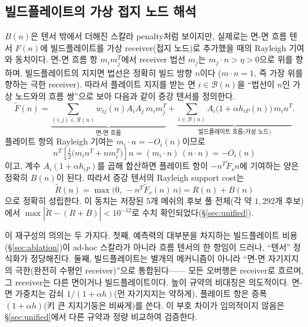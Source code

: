 \documentclass[11pt,a4paper]{article}
\begin{document}
\subsection{빌드플레이트의 가상 접지 노드 해석}
\label{sec:groundnode}

$B(n)$은 텐서 밖에서 더해진 스칼라 penalty처럼 보이지만,
실제로는 면-면 흐름 텐서 $F(n)$에 빌드플레이트를 가상 receiver(접지 노드)로 추가했을 때의
Rayleigh 기여와 동치이다.
면-면 흐름 항 $m_im_j^T$에서 receiver 법선 $m_j$는 $m_j\cdot n>\eta>0$으로 위를 향하며,
빌드플레이트의 지지면 법선은 정확히 빌드 방향 $n$이다
($m\cdot n=1$, 즉 가장 위를 향하는 극한 receiver).
따라서 플레이트 지지를 받는 면 $i\in\mathcal{B}(n)$을 ``법선이 $n$인 가상 노드와의 흐름 쌍''으로 보아
다음과 같이 증강 텐서를 정의한다.
\begin{equation}
\tilde F(n)
=
\underbrace{\sum_{(i,j)\in\mathcal{R}(n)} w_{ij}(n)A_iA_j\,m_im_j^T}_{\text{면-면 흐름}}
+
\underbrace{\sum_{i\in\mathcal{B}(n)} A_i\big(1+\alpha h_{iP}(n)\big)\,m_in^T}_{\text{빌드플레이트 흐름(가상 노드)}}.
\end{equation}
플레이트 항의 Rayleigh 기여는 $m_i\cdot n=-O_i(n)$이므로
\begin{equation}
n^T\!\left[\tfrac{1}{2}\big(m_in^T+nm_i^T\big)\right]\!n
= (m_i\cdot n)\,(n\cdot n) = -O_i(n)
\end{equation}
이고, 계수 $A_i(1+\alpha h_{iP})$를 곱해 합산하면
플레이트 항이 $-n^T\tilde F_s n$에 기여하는 양은 정확히 $B(n)$이 된다.
따라서 증강 텐서의 Rayleigh support cost는
\begin{equation}
\tilde R(n)
=
\max\!\big(0,\,-n^T\tilde F_s(n)\,n\big)
=
R(n)+B(n)
\label{eq:Rtilde}
\end{equation}
으로 정확히 성립한다.
이 동치는 저장된 5개 메쉬의 후보 풀 전체(각 약 $1{,}292$개 후보)에서
$\max|\tilde R-(R+B)|<10^{-12}$로 수치 확인되었다(\S\ref{sec:unified}).

이 재구성의 의의는 두 가지다.
첫째, 예측력의 대부분을 차지하는 빌드플레이트 비용(\S\ref{sec:ablation})이
ad-hoc 스칼라가 아니라 흐름 텐서의 한 항임이 드러나, ``텐서'' 정식화가 정당해진다.
둘째, 빌드플레이트는 별개의 메커니즘이 아니라
``면-면 자기지지의 극한(완전히 수평인 receiver)''으로 통합된다——
모든 오버행은 receiver로 흐르며, 그 receiver는 다른 면이거나 빌드플레이트이다.
높이 규약의 비대칭은 의도적이다.
면-면 가중치는 감쇠 $1/(1+\alpha h)$(먼 자기지지는 약하게),
플레이트 항은 증폭 $(1+\alpha h)$(키 큰 지지기둥은 비싸게)를 쓴다.
이 부호 차이가 임의적이지 않음은 \S\ref{sec:unified}에서 다른 규약과 정량 비교하여 검증한다.
\end{document}
